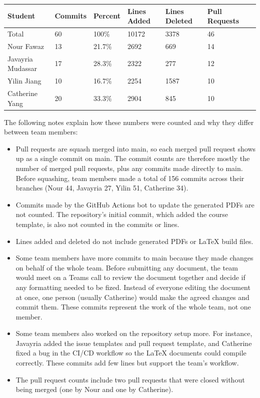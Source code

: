 \documentclass{article}
\begin{document}
\begin{table}[H]
\centering
\begin{tabular}{lllllll}
\toprule
\textbf{Student} & \textbf{Commits} & \textbf{Percent} & \textbf{Lines Added} &
\textbf{Lines Deleted} & \textbf{Pull Requests}\\
\midrule
Total & 60 & 100\% & 10172 & 3378 & 46\\
Nour Fawaz & 13 & 21.7\% & 2692 & 669 & 14\\
Javayria Mudassar & 17 & 28.3\% & 2322 & 277 & 12\\
Yilin Jiang & 10 & 16.7\% & 2254 & 1587 & 10\\
Catherine Yang & 20 & 33.3\% & 2904 & 845 & 10\\
\bottomrule
\end{tabular}
\end{table}

\noindent
The following notes explain how these numbers were counted and why they differ
between team members:
\begin{itemize}
    \item Pull requests are squash merged into main, so each merged pull request
    shows up as a single commit on main. The commit counts are therefore mostly
    the number of merged pull requests, plus any commits made directly to main.
    Before squashing, team members made a total of 156 commits across their
    branches (Nour 44, Javayria 27, Yilin 51, Catherine 34).
    \item Commits made by the GitHub Actions bot to update the generated PDFs are
    not counted. The repository's initial commit, which added the course
    template, is also not counted in the commits or lines.
    \item Lines added and deleted do not include generated PDFs or LaTeX build
    files.
    \item Some team members have more commits to main because they made changes
    on behalf of the whole team. Before submitting any document, the team would meet on a 
    Teams call to review the document together and decide if any formatting needed to be fized.
     Instead of everyone editing the
    document at once, one person (usually Catherine) would make the agreed
    changes and commit them. These commits represent the work of the whole
    team, not one member.
    \item Some team members also worked on the repository setup more. For instance, Javayria added the issue templates and pull request template,
    and Catherine fixed a bug in the CI/CD workflow so the LaTeX documents could compile correctly. These
    commits add few lines but support the team's workflow.
    \item The pull request counts include two pull requests that were closed
    without being merged (one by Nour and one by Catherine).
\end{itemize}
\end{document}

